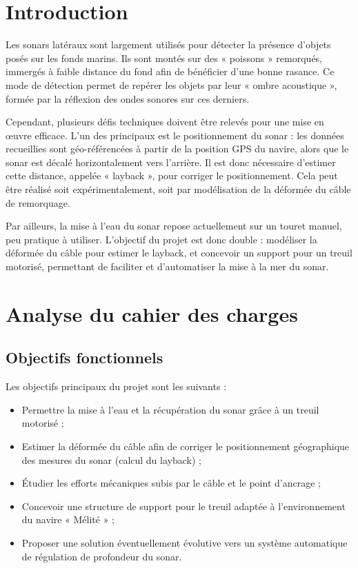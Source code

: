 \documentclass[12pt,a4paper]{report}
\begin{document}
\chapter{Introduction}

Les sonars latéraux sont largement utilisés pour détecter la présence d’objets posés sur les fonds marins.
Ils sont montés sur des « poissons » remorqués, immergés à faible distance du fond afin de bénéficier d’une bonne rasance.
Ce mode de détection permet de repérer les objets par leur « ombre acoustique », formée par la réflexion des ondes sonores sur ces derniers.


Cependant, plusieurs défis techniques doivent être relevés pour une mise en œuvre efficace.
L’un des principaux est le positionnement du sonar : les données recueillies sont géo-référencées à partir de la
position GPS du navire, alors que le sonar est décalé horizontalement vers l’arrière. Il est donc nécessaire d’estimer
cette distance, appelée « layback », pour corriger le positionnement. Cela peut être réalisé soit expérimentalement,
soit par modélisation de la déformée du câble de remorquage.


Par ailleurs, la mise à l’eau du sonar repose actuellement sur un touret manuel, peu pratique à utiliser.
L’objectif du projet est donc double : modéliser la déformée du câble pour estimer le layback,
et concevoir un support pour un treuil motorisé, permettant de faciliter et d’automatiser la mise à la mer du
sonar.


\chapter{Analyse du cahier des charges}

\section{Objectifs fonctionnels}

Les objectifs principaux du projet sont les suivants :

\begin{itemize}

  \item Permettre la mise à l’eau et la récupération du sonar grâce à un treuil motorisé ;
  \item Estimer la déformée du câble afin de corriger le positionnement géographique des mesures du sonar
  (calcul du layback) ;
  \item Étudier les efforts mécaniques subis par le câble et le point d’ancrage ;
  \item Concevoir une structure de support pour le treuil adaptée à l’environnement du navire « Mélité » ;
  \item Proposer une solution éventuellement évolutive vers un système automatique de régulation de profondeur du sonar.

\end{itemize}
\end{document}
